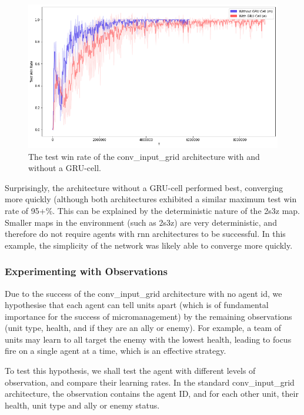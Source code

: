 \begin{figure}
    \centering
    \includegraphics[scale=0.3]{images/graphs/observations/rnn_vs_non_rnn.png}
    \caption{The test win rate of the conv\_input\_grid architecture with and without a GRU-cell.}
    \label{fig:rnn_vs_no_rnn}
\end{figure}

Surprisingly, the architecture without a GRU-cell performed best, converging more quickly (although both architectures exhibited a similar maximum test win rate of 95+\%. This can be explained by the deterministic nature of the 2s3z map. Smaller maps in the environment (such as 2s3z) are very deterministic, and therefore do not require agents with rnn architectures to be successful. In this example, the simplicity of the network was likely able to converge more quickly.


\subsubsection{Experimenting with Observations}

Due to the success of the conv\_input\_grid architecture with no agent id, we hypothesise that each agent can tell units apart (which is of fundamental importance for the success of micromanagement) by the remaining observations (unit type, health, and if they are an ally or enemy). For example, a team of units may learn to all target the enemy with the lowest health, leading to focus fire on a single agent at a time, which is an effective strategy.

To test this hypothesis, we shall test the agent with different levels of observation, and compare their learning rates. In the standard conv\_input\_grid architecture, the observation contains the agent ID, and for each other unit, their health, unit type and ally or enemy status. 

